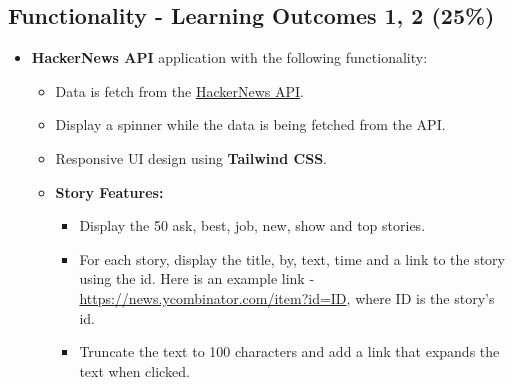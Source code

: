 \documentclass{article}
\begin{document}
	\subsection*{Functionality - Learning Outcomes 1, 2 (25\%)}
	\begin{itemize}
		 \item \textbf{HackerNews API} application with the following functionality:
		 \begin{itemize}
			\item Data is fetch from the \href{https://github.com/HackerNews/API}{HackerNews API}.
			\item Display a spinner while the data is being fetched from the API.
			\item Responsive UI design using \textbf{Tailwind CSS}.
			\item \textbf{Story Features:}
			\begin{itemize}
				\item Display the 50 ask, best, job, new, show and top stories.
				\item For each story, display the title, by, text, time and a link to the story using the id. Here is an example link - \href{https://news.ycombinator.com/item?id=ID}{https://news.ycombinator.com/item?id=ID}, where ID is the story's id.
				\item Truncate the text to 100 characters and add a link that expands the text when clicked.
			\end{itemize}

	

\end{itemize}
\end{itemize}
\end{document}
